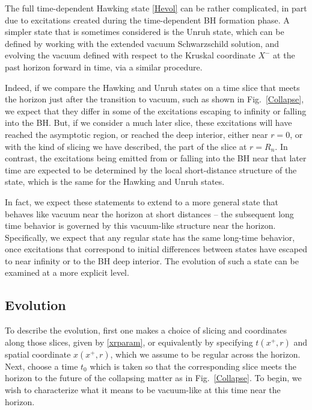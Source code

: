 \documentclass[11pt]{article}
\numberwithin{equation}{section}
\begin{document}
The full time-dependent Hawking state \eqref{Hevol} can be rather complicated, in  part due to excitations created during the time-dependent BH formation phase.  A simpler state that is sometimes considered is the Unruh state\cite{Unru}, which can be defined by working with the extended vacuum Schwarzschild solution, and evolving the vacuum defined with respect to the Kruskal coordinate $X^-$ at the past horizon forward in time, via a similar procedure.

Indeed, if we compare the Hawking and Unruh states on a time slice that meets the horizon just after the transition to vacuum, such as shown in Fig.~\ref{Collapse}, we expect that they differ in some of the excitations escaping to infinity or falling into the BH.  But, if we consider a much later slice, these excitations will have reached the asymptotic region, or reached the deep interior, either near $r=0$, or with the kind of slicing we have described, the part of the slice at $r=R_n$.
In contrast, the excitations being emitted from or falling into the BH near that later time are expected to be determined by the local short-distance structure of the state, which is the same for the Hawking and Unruh states.

In fact, we expect these statements to extend to a more general state that behaves like vacuum near the horizon at short distances -- the subsequent long time behavior is governed by this vacuum-like structure near the horizon.  Specifically, we expect that any regular state has the same long-time behavior, once excitations that correspond to initial differences between states have escaped to near infinity or to  the BH deep interior.  The evolution of such a state can be examined at a more explicit level.  

\subsection{Evolution}

 To describe the evolution, first one makes a choice of slicing and coordinates along those slices, given by \eqref{xrparam}, or equivalently by specifying $t(x^+,r)$ and spatial coordinate $x(x^+,r)$, which we assume to be regular across the horizon.  Next, choose a time $t_0$ which is taken so that the corresponding slice meets the horizon to the future of the collapsing matter as in Fig.~\ref{Collapse}.  To begin, we wish to characterize what it means to be vacuum-like at this time near the horizon.
 
\end{document}
